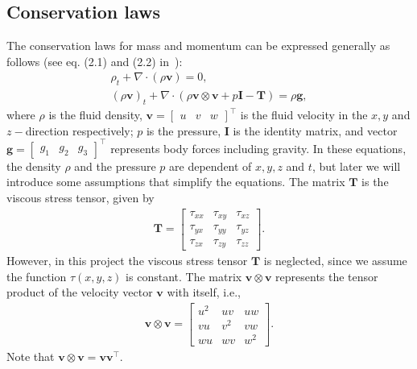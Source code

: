 \subsection{Conservation laws}
The conservation laws for mass and momentum can be expressed generally as follows (see eq. (2.1) and (2.2) in~\cite{Toro2001-Shock}):
\begin{align}
    \rho_t + \nabla \cdot (\rho \mathbf{v}) = 0, \label{eq:mass_conservation} \\
    {(\rho \mathbf{v})}_t + \nabla \cdot (\rho \mathbf{v} \otimes \mathbf{v} + p \mathbf{I} - \mathbf{T}) = \rho \mathbf{g}, \label{eq:momentum_conservation}
\end{align}
where $\rho$ is the fluid density, $\mathbf{v} = \begin{bmatrix} u & v & w \end{bmatrix}^\top$ is the fluid velocity in the $x, y$ and $z-$direction respectively;
$p$ is the pressure, $\mathbf{I}$ is the identity matrix, and vector $\mathbf{g} = \begin{bmatrix}
    g_1 & g_2 & g_3
\end{bmatrix}^\top$ represents body forces including gravity.
In these equations, the density $\rho$ and the pressure $p$ are dependent of $x, y, z$ and $t$, but later we will introduce some assumptions that simplify the equations.
The matrix $\mathbf{T}$ is the viscous stress tensor, given by
\begin{align*}
    \mathbf{T} = \begin{bmatrix}
        \tau_{xx} & \tau_{xy} & \tau_{xz} \\
        \tau_{yx} & \tau_{yy} & \tau_{yz} \\
        \tau_{zx} & \tau_{zy} & \tau_{zz}
    \end{bmatrix}.
\end{align*}
However, in this project the viscous stress tensor $\mathbf{T}$ is neglected, since we assume the function $\tau(x,y,z)$ is constant.
The matrix $\mathbf{v} \otimes \mathbf{v}$ represents the tensor product of the velocity vector $\mathbf{v}$ with itself, i.e.,
\begin{align*}
    \mathbf{v} \otimes \mathbf{v} = \begin{bmatrix}
        u^2 & uv & uw \\
        vu & v^2 & vw \\
        wu & wv & w^2
    \end{bmatrix}.
\end{align*}
Note that $\mathbf{v} \otimes \mathbf{v} = \mathbf{v} \mathbf{v}^\top$.
